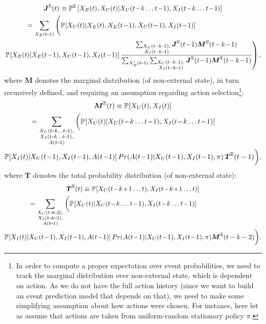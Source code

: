 \documentclass[10pt]{article}
\newcommand{\A}{\mathcal{A}}
\newcommand{\X}{\mathcal{X}}
\newcommand{\PP}[2][]{\mathbb{P\!}_{#1}\left[#2\right]}
\newcommand{\PPe}[2][]{\mathbb{P}^\mathbb{E}_{#1}\left[#2\right]}
\begin{document}
{
\small
\begin{multline}
\boldsymbol{J}^\mathbb{E}(t)\equiv \PPe{X_{E}(t),X_{U}(t)|X_{U}(t\!-\!k\ldots t\!-\!1),X_{I}(t\!-\!k\ldots t\!-\!1)}\\
\shoveleft
{
\quad\quad\,\,\,
=\sum_{X_{E}(t\!-\!1)}
\Bigg(
\PP{X_{U}(t)|X_{E}(t),X_{E}(t\!-\!1),X_{U}(t\!-\!1),X_{I}(t\!-\!1)}
}
\\
\left.
\PP{X_{E}(t)|X_{E}(t\!-\!1),X_{U}(t\!-\!1),X_{I}(t\!-\!1)}
\frac{
\sum_{\substack{X_{U}(t\!-k\!-\!1),\\X_{I}(t\!-k\!-\!1)}} \boldsymbol{J}^\mathbb{E}(t\!-\!1) \boldsymbol{M}^\mathbb{E}(t\!-k\!-\!1)
}{
  \sum_{X_{E}'(t\!-\!1)} \sum_{\substack{X_{U}(t\!-k\!-\!1),\\X_{I}(t\!-k\!-\!1)}} \boldsymbol{J}^\mathbb{E}(t\!-\!1) \boldsymbol{M}^\mathbb{E}(t\!-k\!-\!1)
}
\right),%
\label{eq:joint-expected}
\end{multline}
where $\boldsymbol{M}$ denotes the marginal distribution (of non-external state), in turn recursively defined, and requiring an assumption regarding action selection\footnote{In order to compute a proper expectation over event probabilities, we need to track the marginal distribution over non-external state, which is dependent on action.  As we do not have the full action history (since we want to build an event prediction model that depends on that), we need to make some simplifying assumption about how actions were chosen.  For instance, here let as assume that actions are taken from uniform-random stationary policy $\pi$.}:
\begin{multline}
\boldsymbol{M}^\mathbb{E}(t) \equiv \PP{X_{U}(t),X_{I}(t)} \\
\shoveleft{\quad\quad\quad
=
\sum_{\substack{X_{U}(t\!-\!k\ldots t\!-\!1),\\X_{I}(t\!-\!k\ldots t\!-\!1),\\A(t\!-\!1)}} 
\bigg(
\PP{X_{U}(t)|X_{U}(t\!-\!k\ldots t\!-\!1),X_{I}(t\!-\!k\ldots t\!-\!1)}
}\\
\PP{X_{I}(t)|X_{U}(t\!-\!1),X_{I}(t\!-\!1),A(t\!-\!1)}Pr(A(t\!-\!1)|X_{U}(t\!-\!1),X_{I}(t\!-\!1),\pi)
\,\boldsymbol{T}^\mathbb{E}(t-1) \bigg),
\end{multline}
where $\boldsymbol{T}$ denotes the total probability distribution (of non-external state):
\begin{multline}
\boldsymbol{T}^\mathbb{E}(t) \equiv \PP{X_{U}(t\!-\!k\!+\!1\ldots t),X_{I}(t\!-\!k\!+\!1\ldots t)}\\
\shoveleft{\quad\quad\quad
=
\sum_{\substack{X_{U}(t\!-\!k\!-\!2),\\X_{I}(t\!-\!k\!-\!2),\\A(t\!-\!1)}} 
\bigg(
\PP{X_{U}(t)|X_{U}(t\!-\!k\ldots t\!-\!1),X_{I}(t\!-\!k\ldots t\!-\!1)}
}\\
\PP{X_{I}(t)|X_{U}(t\!-\!1),X_{I}(t\!-\!1),A(t\!-\!1)}Pr(A(t\!-\!1)|X_{U}(t\!-\!1),X_{I}(t\!-\!1),\pi)
\boldsymbol{M}^\mathbb{E}(t-k-2) \bigg).
\end{multline}

}
\end{document}
